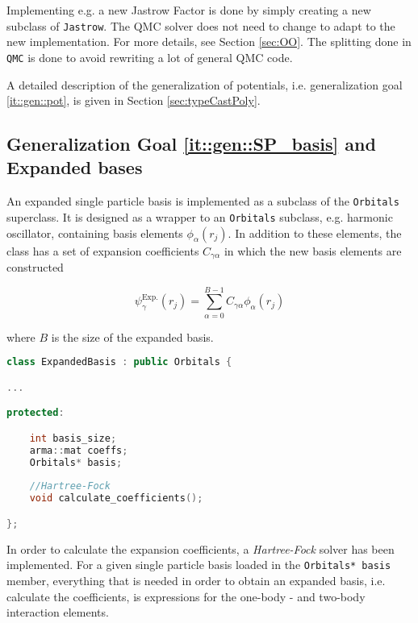 Implementing e.g. a new Jastrow Factor is done by simply creating a new subclass of \verb+Jastrow+. The QMC solver does not need to change to adapt to the new implementation. For more details, see Section \ref{sec:OO}. The splitting done in \verb+QMC+ is done to avoid rewriting a lot of general QMC code.

A detailed description of the generalization of potentials, i.e. generalization goal \ref{it::gen::pot}, is given in Section \ref{sec:typeCastPoly}.

\subsection{Generalization Goal \ref{it::gen::SP_basis} and Expanded bases}

An expanded single particle basis is implemented as a subclass of the \verb+Orbitals+ superclass. It is designed as a wrapper to an \verb+Orbitals+ subclass, e.g. harmonic oscillator, containing basis elements $\phi_\alpha(r_j)$. In addition to these elements, the class has a set of expansion coefficients $C_{\gamma\alpha}$ in which the new basis elements are constructed

\begin{equation}
\label{eq:ExpBasisSP}
 \psi_\gamma^\mathrm{Exp.}(r_j) = \sum_{\alpha=0}^{B - 1} C_{\gamma\alpha}\phi_\alpha(r_j) 
\end{equation}

where $B$ is the size of the expanded basis.

\vspace{0.5cm}
\begin{lstlisting}[language=C++]
class ExpandedBasis : public Orbitals {

...

protected:

    int basis_size;
    arma::mat coeffs;
    Orbitals* basis;
    
    //Hartree-Fock
    void calculate_coefficients();

};

\end{lstlisting}

In order to calculate the expansion coefficients, a \textit{Hartree-Fock} solver has been implemented. For a given single particle basis loaded in the \verb+Orbitals* basis+ member, everything that is needed in order to obtain an expanded basis, i.e. calculate the coefficients, is expressions for the one-body - and two-body interaction elements.

